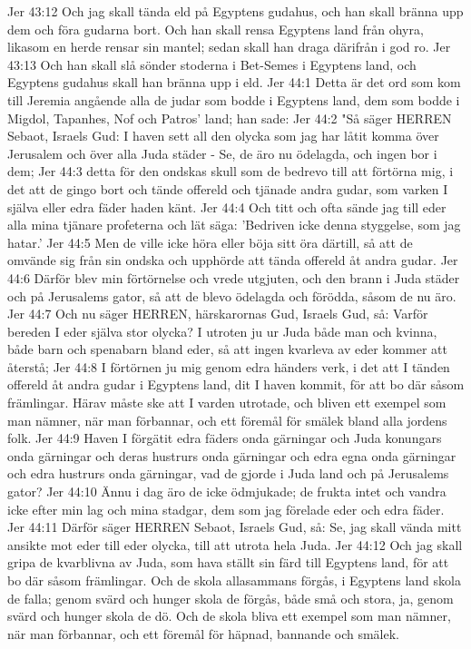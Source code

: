 Jer 43:12  Och jag skall tända eld på Egyptens gudahus, och han skall bränna upp dem och föra gudarna bort. Och han skall rensa Egyptens land från ohyra, likasom en herde rensar sin mantel; sedan skall han draga därifrån i god ro.
Jer 43:13  Och han skall slå sönder stoderna i Bet-Semes i Egyptens land, och Egyptens gudahus skall han bränna upp i eld.
Jer 44:1  Detta är det ord som kom till Jeremia angående alla de judar som bodde i Egyptens land, dem som bodde i Migdol, Tapanhes, Nof och Patros' land; han sade:
Jer 44:2  "Så säger HERREN Sebaot, Israels Gud: I haven sett all den olycka som jag har låtit komma över Jerusalem och över alla Juda städer - Se, de äro nu ödelagda, och ingen bor i dem;
Jer 44:3  detta för den ondskas skull som de bedrevo till att förtörna mig, i det att de gingo bort och tände offereld och tjänade andra gudar, som varken I själva eller edra fäder haden känt.
Jer 44:4  Och titt och ofta sände jag till eder alla mina tjänare profeterna och lät säga: 'Bedriven icke denna styggelse, som jag hatar.'
Jer 44:5  Men de ville icke höra eller böja sitt öra därtill, så att de omvände sig från sin ondska och upphörde att tända offereld åt andra gudar.
Jer 44:6  Därför blev min förtörnelse och vrede utgjuten, och den brann i Juda städer och på Jerusalems gator, så att de blevo ödelagda och förödda, såsom de nu äro.
Jer 44:7  Och nu säger HERREN, härskarornas Gud, Israels Gud, så: Varför bereden I eder själva stor olycka? I utroten ju ur Juda både man och kvinna, både barn och spenabarn bland eder, så att ingen kvarleva av eder kommer att återstå;
Jer 44:8  I förtörnen ju mig genom edra händers verk, i det att I tänden offereld åt andra gudar i Egyptens land, dit I haven kommit, för att bo där såsom främlingar. Härav måste ske att I varden utrotade, och bliven ett exempel som man nämner, när man förbannar, och ett föremål för smälek bland alla jordens folk.
Jer 44:9  Haven I förgätit edra fäders onda gärningar och Juda konungars onda gärningar och deras hustrurs onda gärningar och edra egna onda gärningar och edra hustrurs onda gärningar, vad de gjorde i Juda land och på Jerusalems gator?
Jer 44:10  Ännu i dag äro de icke ödmjukade; de frukta intet och vandra icke efter min lag och mina stadgar, dem som jag förelade eder och edra fäder.
Jer 44:11  Därför säger HERREN Sebaot, Israels Gud, så: Se, jag skall vända mitt ansikte mot eder till eder olycka, till att utrota hela Juda.
Jer 44:12  Och jag skall gripa de kvarblivna av Juda, som hava ställt sin färd till Egyptens land, för att bo där såsom främlingar. Och de skola allasammans förgås, i Egyptens land skola de falla; genom svärd och hunger skola de förgås, både små och stora, ja, genom svärd och hunger skola de dö. Och de skola bliva ett exempel som man nämner, när man förbannar, och ett föremål för häpnad, bannande och smälek.
